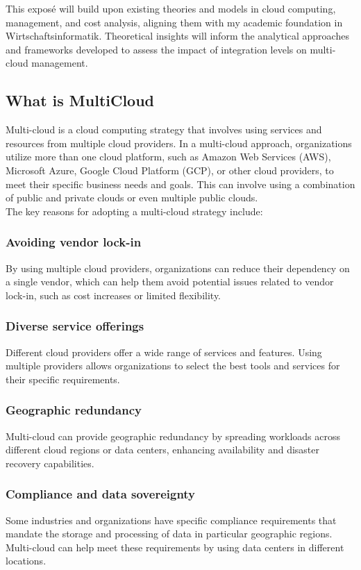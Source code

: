 This exposé will build upon existing theories and models in cloud computing, management, and cost analysis, 
aligning them with my academic foundation in Wirtschaftsinformatik. 
Theoretical insights will inform the analytical approaches and frameworks developed to assess the impact of integration levels on multi-cloud management.

\subsection{What is MultiCloud}

Multi-cloud is a cloud computing strategy that involves using services and resources from multiple cloud providers. 
In a multi-cloud approach, organizations utilize more than one cloud platform, such as Amazon Web Services (AWS), Microsoft Azure, Google Cloud Platform (GCP), 
or other cloud providers, to meet their specific business needs and goals. 
This can involve using a combination of public and private clouds or even multiple public clouds.\\
The key reasons for adopting a multi-cloud strategy include:

\subsubsection{Avoiding vendor lock-in}
By using multiple cloud providers, organizations can reduce their dependency on a single vendor, 
which can help them avoid potential issues related to vendor lock-in, such as cost increases or limited flexibility.

\subsubsection{Diverse service offerings} 
Different cloud providers offer a wide range of services and features. 
Using multiple providers allows organizations to select the best tools and services for their specific requirements.

\subsubsection{Geographic redundancy} 
Multi-cloud can provide geographic redundancy by spreading workloads across different cloud regions or data centers, 
enhancing availability and disaster recovery capabilities.

\subsubsection{Compliance and data sovereignty}
Some industries and organizations have specific compliance requirements that mandate the storage and processing of 
data in particular geographic regions. Multi-cloud can help meet these requirements by using data centers in different locations.

